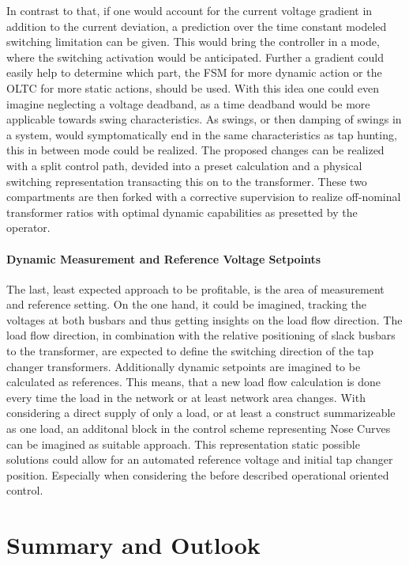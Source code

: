 In contrast to that, if one would account for the current voltage gradient in addition to the current deviation, a prediction over the time constant modeled switching limitation can be given.
This would bring the controller in a mode, where the switching activation would be anticipated.
Further a gradient could easily help to determine which part, the \acs{FSM} for more dynamic action or the \acs{OLTC} for more static actions, should be used.
With this idea one could even imagine neglecting a voltage deadband, as a time deadband would be more applicable towards swing characteristics. 
As swings, or then damping of swings in a system, would symptomatically end in the same characteristics as tap hunting, this in between mode could be realized.
The proposed changes can be realized with a split control path, devided into a preset calculation and a physical switching representation transacting this on to the transformer. 
These two compartments are then forked with a corrective supervision to realize off-nominal transformer ratios with optimal dynamic capabilities as presetted by the operator.

\subsubsection{Dynamic Measurement and Reference Voltage Setpoints}

The last, least expected approach to be profitable, is the area of measurement and reference setting.
On the one hand, it could be imagined, tracking the voltages at both busbars and thus getting insights on the load flow direction.
The load flow direction, in combination with the relative positioning of slack busbars to the transformer, are expected to define the switching direction of the tap changer transformers.
Additionally dynamic setpoints are imagined to be calculated as references.
This means, that a new load flow calculation is done every time the load in the network or at least network area changes.
With considering a direct supply of only a load, or at least a construct summarizeable as one load, an additonal block in the control scheme representing Nose Curves can be imagined as suitable approach.
This representation static possible solutions could allow for an automated reference voltage and initial tap changer position.
Especially when considering the before described operational oriented control.

\chapter{Summary and Outlook}
\label{chap:summary}

